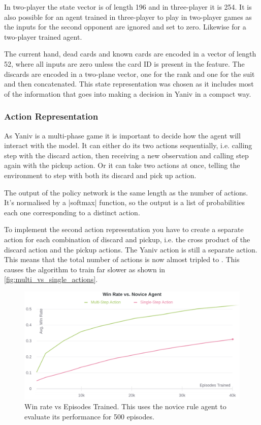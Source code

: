 \documentclass[../main.tex]{subfiles}
\begin{document}
In two-player the state vector is of length 196 and in three-player it is 254. It is also possible for an agent trained in three-player to play in two-player games as the inputs for the second opponent are ignored and set to zero. Likewise for a two-player trained agent. 

The current hand, dead cards and known cards are encoded in a vector of length 52, where all inputs are zero unless the card ID is present in the feature. The discards are encoded in a two-plane vector, one for the rank and one for the suit and then concatenated. This state representation was chosen as it includes most of the information that goes into making a decision in Yaniv in a compact way. 

\subsubsection{Action Representation}

As Yaniv is a multi-phase game it is important to decide how the agent will interact with the model. It can either do its two actions sequentially, i.e. calling step with the discard action, then receiving a new observation and calling step again with the pickup action. Or it can take two actions at once, telling the environment to step with both its discard and pick up action. 

The output of the policy network is the same length as the number of actions. It's normalised by a |softmax| function, so the output is a list of probabilities each one corresponding to a distinct action. 

To implement the second action representation you have to create a separate action for each combination of discard and pickup, i.e. the cross product of the discard action and the pickup actions. The Yaniv action is still a separate action. This means that the total number of actions is now almost tripled to . This causes the algorithm to train far slower as shown in \autoref{fig:multi_vs_single_actions}.

\begin{figure}
    \centering
    \includegraphics[width=\textwidth,keepaspectratio]{images/method/multi_vs_single_actions.png}
    \caption{Win rate vs Episodes Trained. This uses the novice rule agent to evaluate its performance for 500 episodes.}
    \label{fig:multi_vs_single_actions}
\end{figure}
\end{document}
